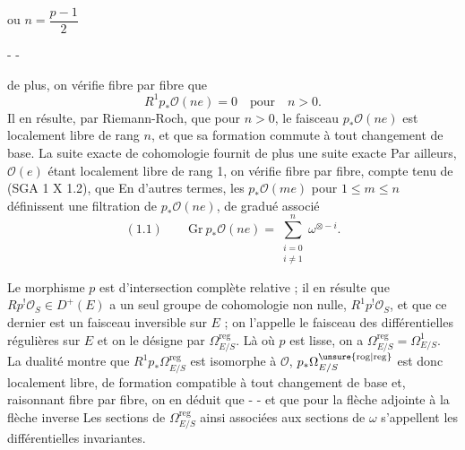ou $n=\dfrac{p-1}{2}$

-  -

de plus, on vérifie fibre par fibre que
\[
R^1p_*\mathcal O(ne)=0\quad\text{pour}\quad n>0.
\]
Il en résulte, par Riemann-Roch, que pour $n>0$, le faisceau $p_*\mathcal O(ne)$ est localement libre de rang $n$, et que sa formation commute à tout changement de base. La suite exacte de cohomologie fournit de plus une suite exacte
Par ailleurs, $\mathcal O(e)$ étant localement libre de rang 1, on vérifie fibre par fibre, compte tenu de (SGA 1 X 1.2), que
En d'autres termes, les $p_*\mathcal O(me)$ pour $1\leq m\leq n$ définissent une filtration de $p_*\mathcal O(ne)$, de gradué associé
\[
(1.1)\qquad \mathrm{Gr}\ p_*\mathcal O(ne)=\sum_{\substack{i=0\\i\ne1}}^n\omega^{\otimes-i}.
\]

Le morphisme $p$ est d'intersection complète relative ; il en résulte que $Rp^!\mathcal O_S\in D^+(E)$ \inserted{\unsure{$\rho$}} a un seul groupe de cohomologie non nulle, $R^1p^!\mathcal O_S$, et que ce dernier est un faisceau inversible sur $E$ ; on l'appelle le faisceau des différentielles régulières sur $E$ et on le désigne par $\Omega^{\mathrm{reg}}_{E/S}$. Là où $p$ est lisse, on a $\Omega^{\mathrm{reg}}_{E/S}=\Omega^1_{E/S}$. La dualité montre que $R^1p_*\Omega^{\mathrm{reg}}_{E/S}$ est isomorphe à $\mathcal O$, $p_*\Omega^{\unsure{\mathrm{rog}|\mathrm{reg}}}_{E/S}$ est donc\inserted{\unsure{$\rho$}} localement libre, de formation compatible à tout changement de base et, raisonnant fibre par fibre, on en déduit que
-  -
et que pour la flèche adjointe à la flèche inverse
Les sections de $\Omega^{\mathrm{reg}}_{E/S}$ ainsi associées aux sections de $\omega$ s'appellent les différentielles invariantes.

